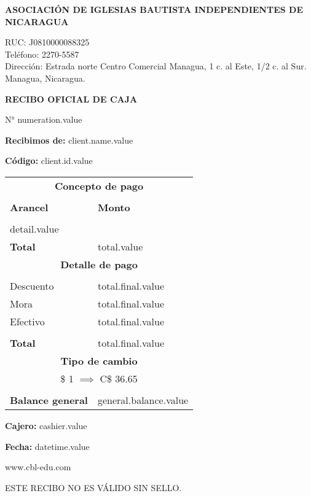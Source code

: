 \documentclass[11pt]{article}
\newcommand{\thenumber}{numeration.value}
\newcommand{\clientName}{client.name.value}
\newcommand{\clientId}{client.id.value}
\newcommand{\detail}{detail.value}
\newcommand{\total}{total.value}
\newcommand{\finalTotal}{total.final.value}
\newcommand{\cashier}{cashier.value}
\newcommand{\datetime}{datetime.value}
\newcommand{\generalBalance}{general.balance.value}
\begin{document}
    \begin{center}
        \textbf{ASOCIACIÓN DE IGLESIAS BAUTISTA INDEPENDIENTES DE NICARAGUA}\par
        {
            \small
            RUC: J0810000088325\\
            Teléfono: 2270-5587\\
            Dirección: Estrada norte Centro Comercial Managua, 1 c. al Este, 1/2 c. al Sur. Managua, Nicaragua.\par
        }
        \textbf{RECIBO OFICIAL DE CAJA}\par
        N° \thenumber
    \end{center}
    \textbf{Recibimos de:} \clientName\par
    \textbf{Código:} \clientId

    \begin{longtable}{p{3.8cm} p{1.8cm}}
        \hline
        \multicolumn{2}{c}{\textbf{Concepto de pago}} \\\\
        \textbf{Arancel} & \textbf{Monto} \\\\
        \detail\\
        \textbf{Total} & \total\\
        \hline
        \multicolumn{2}{c}{\textbf{Detalle de pago}} \\\\
        Descuento & \finalTotal\\
        Mora & \finalTotal\\
        Efectivo & \finalTotal\\
        \\\textbf{Total} & \finalTotal\\
        \hline
        \multicolumn{2}{c}{\textbf{Tipo de cambio}} \\
        \multicolumn{2}{c}{\$ 1 $\implies$ C\$ 36.65}\\\\
        \hline
        \textbf{Balance general} & \generalBalance
    \end{longtable}
    
    \textbf{Cajero:} \cashier\par
    \textbf{Fecha:} \datetime
    \begin{center}
        www.cbl-edu.com\par
        ESTE RECIBO NO ES VÁLIDO SIN SELLO.
    \end{center}
\end{document}
